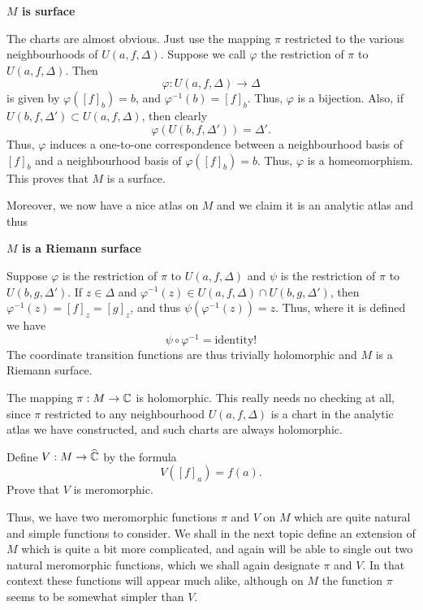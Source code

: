 \documentclass[a4paper,11pt]{article}
\newcounter{topic}
\begin{document}
\begin{mdframed}[skipabove=1ex,skipbelow=1ex]
\centerline{\bf $M$ is surface}
\end{mdframed}

The charts are almost obvious.  Just use the mapping $\pi$ restricted
to the various neighbourhoods of $U(a,f,\Delta)$.  Suppose we call
$\varphi$ the restriction of $\pi$ to $U(a,f,\Delta)$.  Then
$$
\varphi : U(a,f,\Delta) \to \Delta
$$
is given by $\varphi([f]_b) = b$, and $\varphi^{-1}(b) = [f]_b$.
Thus, $\varphi$ is a bijection.  Also, if $U(b,f,\Delta') \subset
U(a,f, \Delta)$, then clearly
$$
\varphi(U(b,f,\Delta')) = \Delta'.
$$
Thus, $\varphi$ induces a one-to-one correspondence between a
neighbourhood basis of $[f]_b$ and a neighbourhood basis of
$\varphi([f]_b) = b$.  Thus, $\varphi$ is a homeomorphism.  This
proves that $M$ is a surface.

Moreover, we now have a nice atlas on $M$ and we claim it is an
analytic atlas and thus

\begin{mdframed}[skipabove=1ex,skipbelow=1ex]
\centerline{\bf $M$ is a Riemann surface}
\end{mdframed}

Suppose $\varphi$ is the restriction of $\pi$ to $U(a,f,\Delta)$ and
$\psi$ is the restriction of $\pi$ to $U(b,g,\Delta')$.  If $z \in
\Delta$ and $\varphi^{-1}(z) \in U(a,f,\Delta) \cap U(b,g,\Delta')$,
then $\varphi^{-1}(z) = [f]_z = [g]_z$, and thus
$\psi(\varphi^{-1}(z)) = z$.  Thus, where it is defined we have
$$
\psi \circ \varphi^{-1} = \text{identity}!
$$
The coordinate transition functions are thus trivially holomorphic and
$M$ is a Riemann surface.

The mapping $\pi : M \to {\mathbb C}$ is holomorphic.  This really needs no
checking at all, since $\pi$ restricted to any neighbourhood
$U(a,f,\Delta)$ is a chart in the analytic atlas we have constructed,
and such charts are always holomorphic.

\begin{ques}
  \label{problem:2}
  Define $V : M \to \widehat{{\mathbb C}}$ by the formula
  $$
  V([f]_a) = f(a).
  $$
  Prove that $V$ is meromorphic.
\end{ques}

Thus, we have two meromorphic functions $\pi$ and $V$ on $M$ which are
quite natural and simple functions to consider.  We shall in the next
topic define an extension of $M$ which is quite a bit more
complicated, and again will be able to single out two natural
meromorphic functions, which we shall again designate $\pi$ and $V$.
In that context these functions will appear much alike, although on
$M$ the function $\pi$ seems to be somewhat simpler than $V$.
\end{document}

